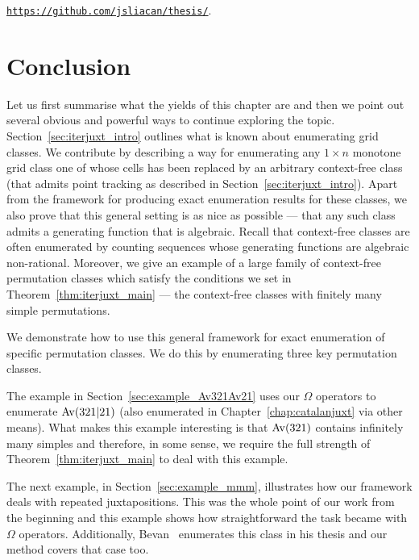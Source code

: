 \documentclass[12pt, a4paper, twoside]{report}
\begin{document}
\begin{center}\href{https://github.com/jsliacan/thesis}{\texttt{https://github.com/jsliacan/thesis/}}.\end{center}


\section{Conclusion}
\label{sec:iterjuxt_conclusion}
Let us first summarise what the yields of this chapter are and then we point out several obvious and powerful ways to continue exploring the topic. Section~\ref{sec:iterjuxt_intro} outlines what is known about enumerating grid classes. We contribute by describing a way for enumerating any $1\times n$ monotone grid class one of whose cells has been replaced by an arbitrary context-free class (that admits point tracking as described in Section~\ref{sec:iterjuxt_intro}). Apart from the framework for producing exact enumeration results for these classes, we also prove that this general setting is as nice as possible --- that any such class admits a generating function that is algebraic. Recall that context-free classes are often enumerated by counting sequences whose generating functions are algebraic non-rational. Moreover, we give an example of a large family of context-free permutation classes which satisfy the conditions we set in Theorem~\ref{thm:iterjuxt_main} --- the context-free classes with finitely many simple permutations.

We demonstrate how to use this general framework for exact enumeration of specific permutation classes. We do this by enumerating three key permutation classes.

The example in Section~\ref{sec:example_Av321Av21} uses our $\Omega$ operators to enumerate $\mathrm{Av}(321|21)$ (also enumerated in Chapter~\ref{chap:catalanjuxt} via other means). What makes this example interesting is that $\mathrm{Av}(321)$ contains infinitely many simples and therefore, in some sense, we require the full strength of Theorem~\ref{thm:iterjuxt_main} to deal with this example.

The next example, in Section~\ref{sec:example_mmm}, illustrates how our framework deals with repeated juxtapositions. This was the whole point of our work from the beginning and this example shows how straightforward the task became with $\Omega$ operators. Additionally, Bevan~\cite{bevan2015thesis} enumerates this class in his thesis and our method covers that case too.
\end{document}
